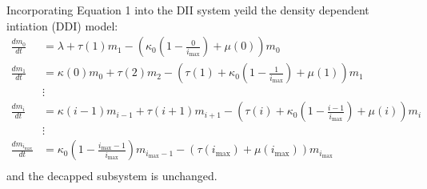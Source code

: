 \documentclass[review]{elsarticle}
\newcommand\mymarginpar[1]{\marginpar{\begin{spacing}{0.7}\singlespacing \tiny #1 \end{spacing}}}  %
\newcommand{\imax}{\ensuremath{i_{\max}}\xspace}
\begin{document}


Incorporating Equation 1 into the DII system yeild the density dependent intiation (DDI) model: %
\begin{align*}
\frac{dm_{0}}{dt} &= \lambda+\tau(1)m_{1}-\left(\kappa_0\left(1-\frac{0}{\imax}\right) + \mu(0)\right)m_{0} \\
\frac{dm_{1}}{dt} &= \kappa(0)m_{0}+\tau(2)m_{2}-\left(\tau(1)+\kappa_0\left(1-\frac{1}{\imax}\right)+\mu(1)\right) m_{1}\\
& \vdots & \\
\frac{dm_{i}}{dt} &= \kappa(i-1)m_{i-1}+\tau(i+1)m_{i+1}-\left(\tau(i)+\kappa_0\left(1-\frac{i-1}{\imax}\right)+\mu(i)\right) m_{i} \\
& \vdots & \\
\frac{dm_{\imax}}{dt} &= \kappa_0\left(1-\frac{\imax-1}{\imax}\right)m_{\imax-1}-\left(\tau(\imax)+\mu(\imax)\right) m_{\imax}\\
\end{align*}
and the decapped subsystem is unchanged.
\end{document}
